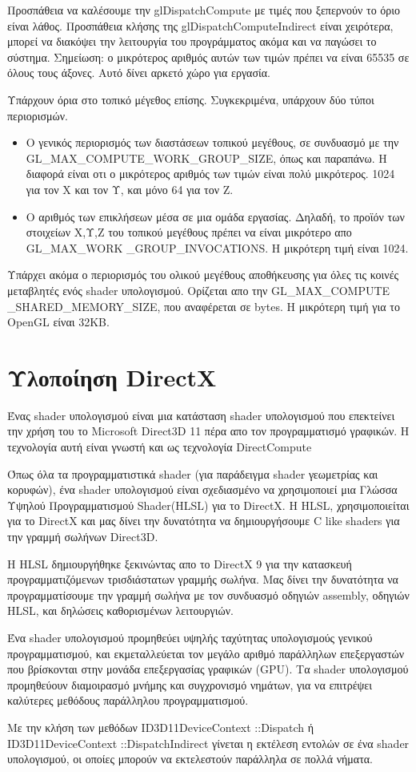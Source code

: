 Προσπάθεια να καλέσουμε την glDispatchCompute με τιμές που ξεπερνούν το όριο είναι λάθος. Προσπάθεια κλήσης της glDispatchComputeIndirect είναι χειρότερα, μπορεί να διακόψει την λειτουργία του προγράμματος ακόμα και να παγώσει το σύστημα. Σημείωση: ο μικρότερος αριθμός αυτών των τιμών πρέπει να είναι 65535 σε όλους τους άξονες. Αυτό δίνει αρκετό χώρο για εργασία. 

Υπάρχουν όρια στο τοπικό μέγεθος επίσης. Συγκεκριμένα, υπάρχουν δύο τύποι περιορισμών. 
\begin{itemize}
\item Ο γενικός περιορισμός των διαστάσεων τοπικού μεγέθους, σε συνδυασμό με την GL\_MAX\_COMPUTE\_WORK\_GROUP\_SIZE, όπως και παραπάνω. Η διαφορά είναι οτι ο μικρότερος αριθμός των τιμών είναι πολύ μικρότερος. 1024 για τον Χ και τον Υ, και μόνο 64 για τον Ζ.
\item Ο αριθμός των επικλήσεων μέσα σε μια ομάδα εργασίας. Δηλαδή, το προϊόν των στοιχείων Χ,Υ,Ζ του τοπικού μεγέθους πρέπει να είναι μικρότερο απο GL\_MAX\_WORK \_GROUP\_INVOCATIONS. Η μικρότερη τιμή είναι 1024.
\end{itemize}
Υπάρχει ακόμα ο περιορισμός του ολικού μεγέθους αποθήκευσης για όλες τις κοινές μεταβλητές ενός shader υπολογισμού. Ορίζεται απο την GL\_MAX\_COMPUTE \_SHARED\_MEMORY\_SIZE, που αναφέρεται σε bytes. Η μικρότερη τιμή για το OpenGL είναι 32KB.
\section{Υλοποίηση DirectX}
Ένας shader υπολογισμού είναι μια κατάσταση shader υπολογισμού που επεκτείνει την χρήση του το Microsoft Direct3D 11 πέρα απο τον προγραμματισμό γραφικών. Η τεχνολογία αυτή είναι γνωστή και ως τεχνολογία DirectCompute\cite{computeshaders-2}

Όπως όλα τα προγραμματιστικά shader (για παράδειγμα shader γεωμετρίας και κορυφών), ένα shader υπολογισμού είναι σχεδιασμένο να χρησιμοποιεί μια Γλώσσα Υψηλού Προγραμματισμού Shader(HLSL) για το DirectX. Η HLSL, χρησιμοποιείται για το DirectX και μας δίνει την δυνατότητα να δημιουργήσουμε C like shaders για την γραμμή σωλήνων Direct3D. 

Η HLSL δημιουργήθηκε ξεκινώντας απο το DirectX 9 για την κατασκευή προγραμματιζόμενων τρισδιάστατων γραμμής σωλήνα. Μας δίνει την δυνατότητα να προγραμματίσουμε την γραμμή σωλήνα με τον συνδυασμό οδηγιών assembly, οδηγιών HLSL, και δηλώσεις καθορισμένων λειτουργιών.

Ένα shader υπολογισμού προμηθεύει υψηλής ταχύτητας υπολογισμούς γενικού προγραμματισμού, και εκμεταλλεύεται τον μεγάλο αριθμό παράλληλων επεξεργαστών που βρίσκονται στην μονάδα επεξεργασίας γραφικών (GPU). Τα shader υπολογισμού προμηθεύουν διαμοιρασμό μνήμης και συγχρονισμό νημάτων, για να επιτρέψει καλύτερες μεθόδους παράλληλου προγραμματισμού. 

Με την κλήση των μεθόδων ID3D11DeviceContext ::Dispatch ή ID3D11DeviceContext ::DispatchIndirect γίνεται η εκτέλεση εντολών σε ένα shader υπολογισμού, οι οποίες μπορούν να εκτελεστούν παράλληλα σε πολλά νήματα.